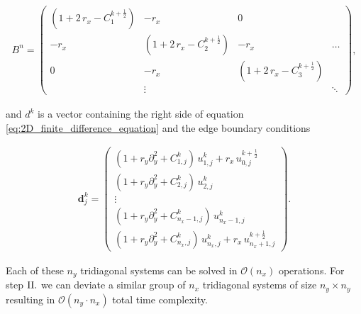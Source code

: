 \begin{align*}
B^n = \left(
\begin{matrix}
    ( 1 + 2 \, r_x - C_1^{k+\frac{1}{2}} ) & - r_x & 0 &   \\
    - r_x  & ( 1 + 2 \, r_x - C_2^{k+\frac{1}{2}} ) & - r_x  & \dots \\
    0 & - r_x  & ( 1 + 2 \, r_x - C_3^{k+\frac{1}{2}} ) &  \\
     & \vdots & & \ddots
\end{matrix}
\right),
\end{align*}

and $d^k$ is a vector containing the right side of equation \eqref{eq:2D_finite_difference_equation} and the edge boundary conditions

\begin{align*}
\boldsymbol d^k_j = \left(
\begin{matrix}
( 1 + r_y \partial_y^2 + C_{1,j}^{k} ) \, u_{1,j}^{k} + r_x \, u_{0,j}^{k+\frac{1}{2}} \\
( 1 + r_y \partial_y^2 + C_{2,j}^{k} ) \, u_{2,j}^{k} \\
\vdots \\
( 1 + r_y \partial_y^2 + C_{n_x - 1,j}^{k} ) \, u_{n_x - 1,j}^{k} \\
( 1 + r_y \partial_y^2 + C_{n_x,j}^{k} ) \, u_{n_x,j}^{k} + r_x \, u_{n_x+1,j}^{k+\frac{1}{2}}
\end{matrix}
\right).
\end{align*}

Each of these $n_y$ tridiagonal systems can be solved in $\mathcal{O}(n_x)$ operations. For step $\RN{2}.$ we can deviate a similar group of $n_x$  tridiagonal systems of size $n_y \times n_y$ resulting in $\mathcal{O}(n_y \cdot n_x)$ total time complexity.





















